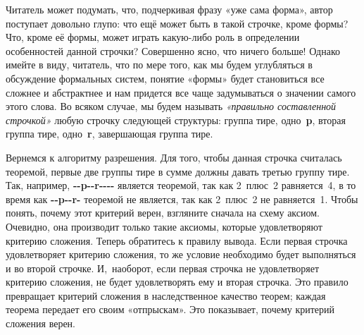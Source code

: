 \documentclass[../main.tex]{subfiles}
\begin{document}
Читатель может подумать, что, подчеркивая фразу «уже сама форма», автор поступает довольно глупо: что ещё может быть в такой строчке, кроме формы? Что, кроме её формы, может играть какую-либо роль в определении особенностей данной строчки? Совершенно ясно, что ничего больше! Однако имейте в виду, читатель, что по мере того, как мы будем углубляться в обсуждение формальных систем, понятие «формы» будет становиться все сложнее и абстрактнее и нам придется все чаще задумываться о значении самого этого слова. Во всяком случае, мы будем называть \emph{«правильно составленной строчкой»} любую строчку следующей структуры: группа тире, одно~\textbf{p}, вторая группа тире, одно~\textbf{r}, завершающая группа тире.

Вернемся к алгоритму разрешения. Для того, чтобы данная строчка считалась теоремой, первые две группы тире в сумме должны давать третью группу тире. Так, например, \textbf{-{}-p-{}-r-{}-{}-{}-} является теоремой, так как 2~плюс~2 равняется~4, в то время как \textbf{-{}-p-{}-r-} теоремой не является, так как 2~плюс~2 не равняется~1. Чтобы понять, почему этот критерий верен, взгляните сначала на схему аксиом. Очевидно, она производит только такие аксиомы, которые удовлетворяют критерию сложения. Теперь обратитесь к правилу вывода. Если первая строчка удовлетворяет критерию сложения, то же условие необходимо будет выполняться и во второй строчке. И,~наоборот, если первая строчка не удовлетворяет критерию сложения, не будет удовлетворять ему и вторая строчка. Это правило превращает критерий сложения в наследственное качество теорем; каждая теорема передает его своим «отпрыскам». Это показывает, почему критерий сложения верен.
\end{document}
